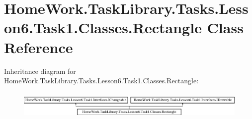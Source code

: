 \hypertarget{class_home_work_1_1_task_library_1_1_tasks_1_1_lesson6_1_1_task1_1_1_classes_1_1_rectangle}{}\section{Home\+Work.\+Task\+Library.\+Tasks.\+Lesson6.\+Task1.\+Classes.\+Rectangle Class Reference}
\label{class_home_work_1_1_task_library_1_1_tasks_1_1_lesson6_1_1_task1_1_1_classes_1_1_rectangle}
Inheritance diagram for Home\+Work.\+Task\+Library.\+Tasks.\+Lesson6.\+Task1.\+Classes.\+Rectangle\+:\begin{figure}[H]
\begin{center}
\leavevmode
\includegraphics[height=1.362530cm]{class_home_work_1_1_task_library_1_1_tasks_1_1_lesson6_1_1_task1_1_1_classes_1_1_rectangle}
\end{center}
\end{figure}
